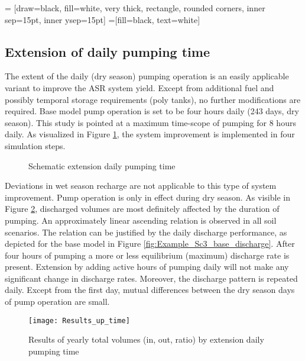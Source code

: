  = [draw=black, fill=white, very thick,
    rectangle, rounded corners, inner sep=15pt, inner ysep=15pt]
 =[fill=black, text=white]

\subsection{Extension of daily pumping time}
\label{Subsec:Up_time}
The extent of the daily (dry season) pumping operation is an easily applicable variant to improve the ASR system yield. Except from additional fuel and possibly temporal storage requirements (poly tanks), no further modifications are required. Base model pump operation is set to be four hours daily (243 days, dry season). This study is pointed at a maximum time-scope of pumping for 8 hours daily. As visualized in Figure \ref{fig:Schematic_up_time}, the system improvement is implemented in four simulation steps. 

\begin{figure}[h!]
\centering
{}
\captionsetup{justification=centering}
\caption{Schematic extension daily pumping time}
\label{fig:Schematic_up_time}
\end{figure}

Deviations in wet season recharge are not applicable to this type of system improvement. Pump operation is only in effect during dry season. As visible in Figure \ref{fig:Results_up_time}, discharged volumes are most definitely affected by the duration of pumping. An approximately linear ascending relation is observed in all soil scenarios. The relation can be justified by the daily discharge performance, as depicted for the base model in Figure \ref{fig:Example_Sc3_base_discharge}. After four hours of pumping a more or less equilibrium (maximum) discharge rate is present. Extension by adding active hours of pumping daily will not make any significant change in discharge rates. Moreover, the discharge pattern is repeated daily. Except from the first day, mutual differences between the dry season days of pump operation are small. \\

\begin{figure}[h!]
 \centering
 \texttt{[image: Results\_up\_time]}
 \captionsetup{justification=centering} 
 \caption{Results of yearly total volumes (in, out, ratio) by extension daily pumping time}
 \label{fig:Results_up_time}
\end{figure}

